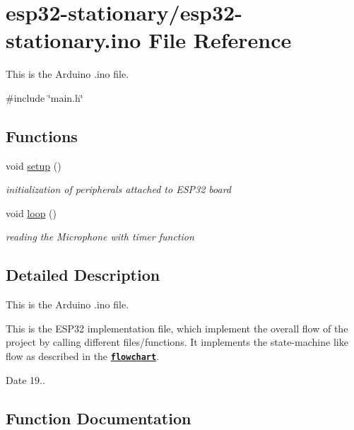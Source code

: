 \hypertarget{esp32-stationary_8ino}{}\section{esp32-\/stationary/esp32-\/stationary.ino File Reference}
\label{esp32-stationary_8ino}


This is the Arduino .ino file.  


{\ttfamily \#include \char`\"{}main.\+h\char`\"{}}\newline
\subsection*{Functions}
\begin{DoxyCompactItemize}
\item 
void \mbox{\hyperlink{esp32-stationary_8ino_a4fc01d736fe50cf5b977f755b675f11d}{setup}} ()
\begin{DoxyCompactList}\small\item\em initialization of peripherals attached to E\+S\+P32 board \end{DoxyCompactList}\item 
void \mbox{\hyperlink{esp32-stationary_8ino_afe461d27b9c48d5921c00d521181f12f}{loop}} ()
\begin{DoxyCompactList}\small\item\em reading the Microphone with timer function \end{DoxyCompactList}\end{DoxyCompactItemize}


\subsection{Detailed Description}
This is the Arduino .ino file. 

This is the E\+S\+P32 implementation file, which implement the overall flow of the project by calling different files/functions. It implements the state-\/machine like flow as described in the \href{StatemachineFlow.pdf}{\texttt{ {\bfseries{flowchart}}}}.

\begin{DoxyDate}{Date}
19.. 
\end{DoxyDate}


\subsection{Function Documentation}
\mbox{\label{esp32-stationary_8ino_afe461d27b9c48d5921c00d521181f12f}} 
